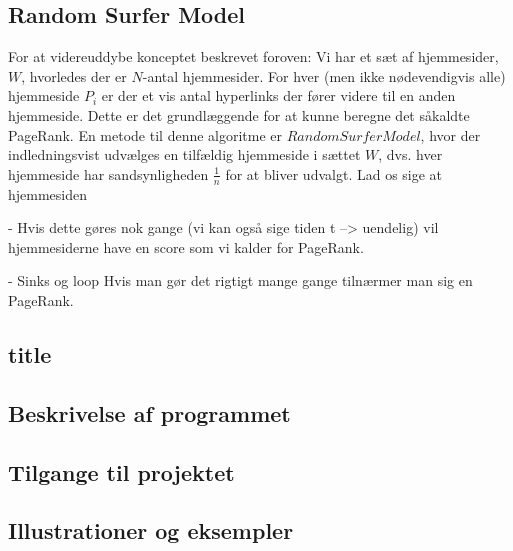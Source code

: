 \subsection*{Random Surfer Model}
For at videreuddybe konceptet beskrevet foroven: Vi har et sæt af hjemmesider, $W$, hvorledes der er $N$-antal hjemmesider. For hver (men ikke nødevendigvis alle) hjemmeside $P_i$ er der et vis antal hyperlinks der fører videre til en anden hjemmeside. Dette er det grundlæggende for at kunne beregne det såkaldte PageRank. En metode til denne algoritme er $Random Surfer Model$, hvor der indledningsvist udvælges en tilfældig hjemmeside i sættet $W$, dvs. hver hjemmeside har sandsynligheden $\frac{1}{n}$ for at bliver udvalgt. Lad os sige at hjemmesiden 

- Hvis dette gøres nok gange (vi kan også sige tiden t --> uendelig) vil hjemmesiderne have en score som vi kalder for PageRank.

- Sinks og loop
Hvis man gør det rigtigt mange gange tilnærmer man sig en PageRank.

\subsection*{title}

\subsection*{Beskrivelse af programmet}

\subsection*{Tilgange til projektet}

\subsection*{Illustrationer og eksempler}